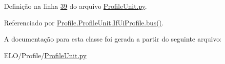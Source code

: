 Definição na linha \hyperlink{ProfileUnit_8py_source_l00039}{39} do arquivo \hyperlink{ProfileUnit_8py_source}{Profile\-Unit.\-py}.



Referenciado por \hyperlink{classProfile_1_1ProfileUnit_1_1IfUiProfile_ac3d0a7a780dcf729b9f3cf1fff243a78}{Profile.\-Profile\-Unit.\-If\-Ui\-Profile.\-bus()}.



A documentação para esta classe foi gerada a partir do seguinte arquivo\-:\begin{DoxyCompactItemize}
\item 
E\-L\-O/\-Profile/\hyperlink{ProfileUnit_8py}{Profile\-Unit.\-py}\end{DoxyCompactItemize}
